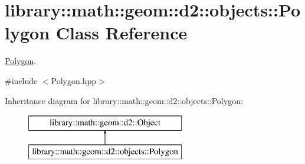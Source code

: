 \hypertarget{classlibrary_1_1math_1_1geom_1_1d2_1_1objects_1_1_polygon}{}\section{library\+:\+:math\+:\+:geom\+:\+:d2\+:\+:objects\+:\+:Polygon Class Reference}
\label{classlibrary_1_1math_1_1geom_1_1d2_1_1objects_1_1_polygon}


\hyperlink{classlibrary_1_1math_1_1geom_1_1d2_1_1objects_1_1_polygon}{Polygon}.  




{\ttfamily \#include $<$Polygon.\+hpp$>$}

Inheritance diagram for library\+:\+:math\+:\+:geom\+:\+:d2\+:\+:objects\+:\+:Polygon\+:\begin{figure}[H]
\begin{center}
\leavevmode
\includegraphics[height=2.000000cm]{classlibrary_1_1math_1_1geom_1_1d2_1_1objects_1_1_polygon}
\end{center}
\end{figure}
